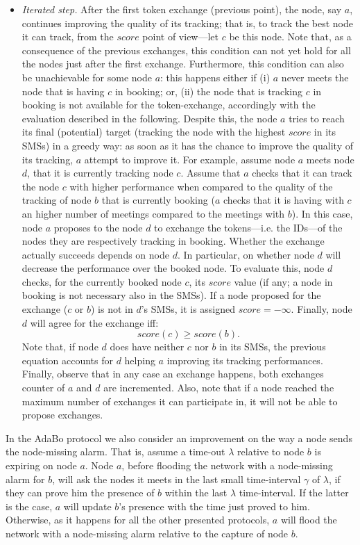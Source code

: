 \documentclass{IEEEconf}
\begin{document}
\begin{itemize}
\item \textit{Iterated step.} After the first token exchange (previous point), the node, say $a$, continues improving the quality of its tracking; that is, to track the best node it can track, from the $score$ point of view---let $c$ be this node.
Note that, as a consequence of the previous exchanges, this condition can not yet hold for all the nodes just after the first exchange. Furthermore, this condition can also be unachievable for some node $a$: this happens either if (i) $a$ never meets the node that is having $c$ in booking; or, (ii) the node that is tracking $c$ in booking is not available for the token-exchange, accordingly with the evaluation described in the following.
Despite this, the node $a$ tries to reach its final (potential) target (tracking the node with the highest $score$ in its SMSs) in a greedy way:
as soon as it has the chance to improve the quality of its tracking, $a$ attempt to improve it. For example, assume node $a$ meets node $d$,
that it is currently tracking node $c$.
Assume that $a$ checks that it can track the node $c$ with higher performance when compared to the quality of the tracking of node $b$ that is currently booking ($a$ checks that it is having with $c$ an higher number of meetings compared to the meetings with $b$). In this case, node $a$ proposes to the node $d$ to exchange the tokens---i.e. the IDs---of the nodes they are respectively tracking in booking. Whether the exchange actually succeeds depends
on node $d$. In particular, on whether node $d$ will decrease the performance over the booked node. To evaluate this, node $d$ checks, for the currently booked node $c$, its $score$ value (if any; a node in booking is not necessary also in the SMSs). If a node proposed for the exchange ($c$ or $b$) is not in $d$'s SMSs, it is assigned $score = -\infty$. Finally, node $d$ will agree for the exchange iff: $$score(c)\ge score(b).$$ Note that, if node $d$ does have neither  $c$  nor $b$ in its SMSs, the previous equation accounts for $d$ helping $a$ improving its tracking performances.
Finally, observe that in any case an exchange happens, both exchanges counter of $a$ and $d$ are incremented. Also, note that if a node reached the maximum number of exchanges it can participate in, it will not be able to propose exchanges.
\end{itemize}

In the AdaBo protocol we also consider an improvement on the way a node sends the node-missing alarm. That is, assume a time-out $\lambda$ relative to node $b$ is expiring on node $a$. Node $a$, before flooding the network with a node-missing alarm for $b$, will ask the nodes it meets in the last small time-interval $\gamma$ of $\lambda$, if they can prove him the  presence of $b$ within the last $\lambda$ time-interval. If the latter is the case, $a$ will update $b$'s presence with the time just proved to him. Otherwise, as it happens for all the other  presented protocols, $a$  will flood the network with a node-missing alarm relative to the capture of node $b$.
\end{document}
